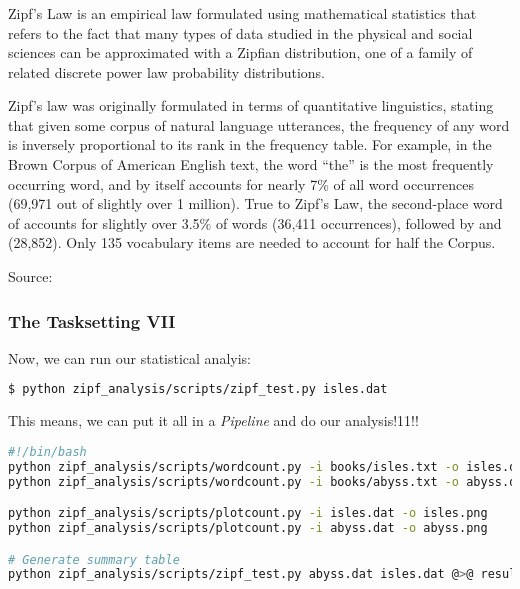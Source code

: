 \begin{frame}
  \frametitle{}
  
Zipf’s Law is an empirical law formulated using mathematical statistics that refers to the fact that many types of data studied in the physical and social sciences can be approximated with a Zipfian distribution, one of a family of related discrete power law probability distributions.

Zipf’s law was originally formulated in terms of quantitative linguistics, stating that given some corpus of natural language utterances, the frequency of any word is inversely proportional to its rank in the frequency table. For example, in the Brown Corpus of American English text, the word ``the'' is the most frequently occurring word, and by itself accounts for nearly 7\% of all word occurrences (69,971 out of slightly over 1 million). True to Zipf’s Law, the second-place word of accounts for slightly over 3.5\% of words (36,411 occurrences), followed by and (28,852). Only 135 vocabulary items are needed to account for half the Corpus.

Source: 
\end{frame}

\begin{frame}[fragile]
  \frametitle{The Tasksetting VII}
  Now, we can run our statistical analyis:
  \begin{lstlisting}[language=Bash, style=Shell]
$ python zipf_analysis/scripts/zipf_test.py isles.dat
  \end{lstlisting}
  \pause
  This means, we can put it all in a \emph{Pipeline} and do our analysis!11!!
  \begin{lstlisting}[language=Bash, style=Shell, basicstyle=\tiny]
#!/bin/bash
python zipf_analysis/scripts/wordcount.py -i books/isles.txt -o isles.dat
python zipf_analysis/scripts/wordcount.py -i books/abyss.txt -o abyss.dat

python zipf_analysis/scripts/plotcount.py -i isles.dat -o isles.png
python zipf_analysis/scripts/plotcount.py -i abyss.dat -o abyss.png

# Generate summary table
python zipf_analysis/scripts/zipf_test.py abyss.dat isles.dat @>@ results.txt
  \end{lstlisting}
\end{frame}


